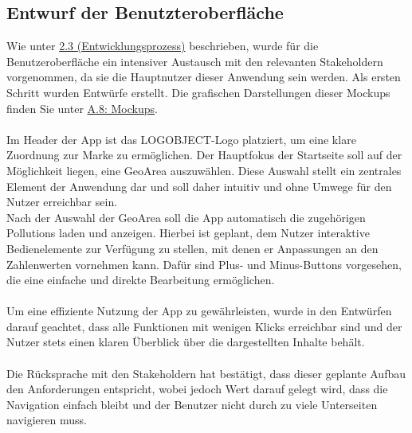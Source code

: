 \documentclass[a4paper,12pt]{article}
\begin{document}
\subsection{Entwurf der Benutzteroberfläche}
Wie unter \hyperref[sec:entwicklungsprozess]{2.3 (Entwicklungsprozess)} beschrieben, wurde für die Benutzeroberfläche ein intensiver Austausch mit den relevanten Stakeholdern vorgenommen, da sie die Hauptnutzer dieser Anwendung sein werden. Als ersten Schritt wurden Entwürfe erstellt. Die grafischen Darstellungen dieser Mockups finden Sie unter \hyperref[sec:mockups]{A.8: Mockups}.\\
\\
Im Header der App ist das \glqq LOGOBJECT\grqq{}-Logo platziert, um eine klare Zuordnung zur Marke zu ermöglichen. Der Hauptfokus der Startseite soll auf der Möglichkeit liegen, eine GeoArea auszuwählen. Diese Auswahl stellt ein zentrales Element der Anwendung dar und soll daher intuitiv und ohne Umwege für den Nutzer erreichbar sein.\\
Nach der Auswahl der GeoArea soll die App automatisch die zugehörigen Pollutions laden und anzeigen. Hierbei ist geplant, dem Nutzer interaktive Bedienelemente zur Verfügung zu stellen, mit denen er Anpassungen an den Zahlenwerten vornehmen kann. Dafür sind Plus- und Minus-Buttons vorgesehen, die eine einfache und direkte Bearbeitung ermöglichen.\\
\\
Um eine effiziente Nutzung der App zu gewährleisten, wurde in den Entwürfen darauf geachtet, dass alle Funktionen mit wenigen Klicks erreichbar sind und der Nutzer stets einen klaren Überblick über die dargestellten Inhalte behält.\\
\\
Die Rücksprache mit den Stakeholdern hat bestätigt, dass dieser geplante Aufbau den Anforderungen entspricht, wobei jedoch Wert darauf gelegt wird, dass die Navigation einfach bleibt und der Benutzer nicht durch zu viele Unterseiten navigieren muss.
\end{document}
